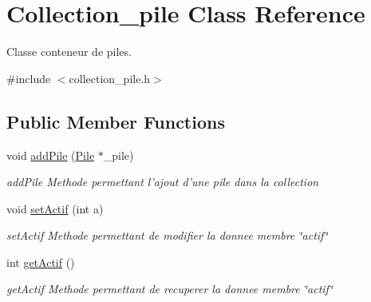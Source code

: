 \hypertarget{class_collection__pile}{\section{Collection\-\_\-pile Class Reference}
\label{class_collection__pile}
}


Classe conteneur de piles.  




{\ttfamily \#include $<$collection\-\_\-pile.\-h$>$}

\subsection*{Public Member Functions}
\begin{DoxyCompactItemize}
\item 
void \hyperlink{class_collection__pile_a238773780820333983c0683700e0ff55}{add\-Pile} (\hyperlink{class_pile}{Pile} $\ast$\-\_\-pile)
\begin{DoxyCompactList}\small\item\em add\-Pile Methode permettant l'ajout d'une pile dans la collection \end{DoxyCompactList}\item 
void \hyperlink{class_collection__pile_ab376d28ce132a2704dd8b663f9a3bf71}{set\-Actif} (int a)
\begin{DoxyCompactList}\small\item\em set\-Actif Methode permettant de modifier la donnee membre \char`\"{}actif\char`\"{} \end{DoxyCompactList}\item 
int \hyperlink{class_collection__pile_af59e6609f30e907eb617e7a30319a03f}{get\-Actif} ()
\begin{DoxyCompactList}\small\item\em get\-Actif Methode permettant de recuperer la donnee membre \char`\"{}actif\char`\"{} \end{DoxyCompactList}\end{DoxyCompactItemize}

